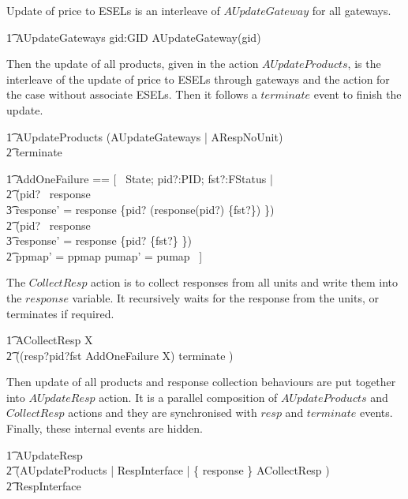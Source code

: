 Update of price to ESELs is an interleave of $AUpdateGateway$ for all gateways.
\begin{circusaction}
    \t1 AUpdateGateways \circdef \Interleave gid:GID \linter \emptyset \rinter \circspot AUpdateGateway(gid)
\end{circusaction}

Then the update of all products, given in the action $AUpdateProducts$, is the interleave of the update of price to ESELs through gateways and the action for the case without associate ESELs. Then it follows a $terminate$ event to finish the update.
\begin{circusaction}
    \t1 AUpdateProducts \circdef (AUpdateGateways \linter \emptyset | \emptyset \rinter ARespNoUnit) \circseq \\
        \t2 terminate \then \Skip
\end{circusaction}

\begin{zed}
    \t1 AddOneFailure == [~ \Delta State; pid?:PID; fst?:FStatus | \\
        \t2 (pid? \in \dom~response \implies \\
            \t3 response' = response \oplus \{pid? \mapsto (response(pid?) \cup \{fst?\}) \}) \land \\
        \t2 (pid? \notin \dom~response \implies \\
            \t3 response' = response \cup \{pid? \mapsto \{fst?\} \}) \land \\
        \t2 ppmap' = ppmap \land pumap' = pumap ~]
\end{zed}

The $CollectResp$ action is to collect responses from all units and write them into the $response$ variable. It recursively waits for the response from the units, or terminates if required.
\begin{circusaction}
        \t1 ACollectResp \circdef \circmu X \circspot \\
            \t2 ((resp?pid?fst \then \lschexpract AddOneFailure \rschexpract \circseq X) \extchoice terminate \then \Skip) 
\end{circusaction}

Then update of all products and response collection behaviours are put together into $AUpdateResp$ action. It is a parallel composition of $AUpdateProducts$ and $CollectResp$ actions and they are synchronised with $resp$ and $terminate$ events. Finally, these internal events are hidden.
\begin{circusaction}
        \t1 AUpdateResp \circdef \\
            \t2 (AUpdateProducts \lpar \emptyset | RespInterface | \{ response \} \rpar ACollectResp ) \\
            \t2 \circhide RespInterface \\
\end{circusaction}

